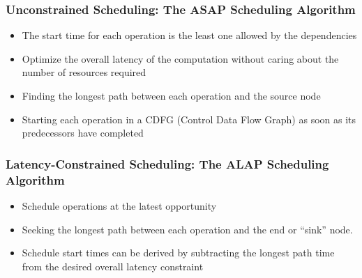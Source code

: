\documentclass[12pt]{article}
\begin{document}
\subsubsection{Unconstrained Scheduling: The ASAP Scheduling Algorithm}
\begin{itemize}
\item The start time for each operation is the least one allowed by the dependencies
\item Optimize the overall latency of the computation without caring about the number of resources required
\item Finding the longest path between each operation and the source node
\item Starting each operation in a CDFG (Control Data Flow Graph) as soon as its predecessors have completed\\
\end{itemize}


\subsubsection{Latency-Constrained Scheduling: The ALAP Scheduling Algorithm}
\begin{itemize}
\item Schedule operations at the latest opportunity
\item Seeking the longest path between each operation and the end or “sink” node.
\item Schedule start times can be derived by subtracting the longest path time from the desired overall latency constraint

\end{itemize}
\end{document}
